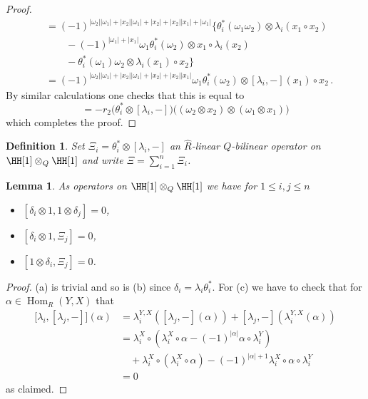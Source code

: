 \documentclass[english,letter paper,12pt,leqno]{article}
\newtheorem{lemma}[theorem]{Lemma}
\theoremstyle{example}
\newtheorem{definition}[theorem]{Definition}
\numberwithin{equation}{section}
\def\Hom{\operatorname{Hom}}
\begin{document}
\begin{proof}
\begin{align*}
&= (-1)^{|\omega_2||\omega_1| + |x_2||\omega_1| + |x_2| + |x_2||x_1| + |\omega_1|} \Big\{ \theta_i^*(\omega_1\omega_2) \otimes \lambda_i(x_1 \circ x_2)\\
&\qquad -(-1)^{|\omega_1| + |x_1|} \omega_1 \theta_i^*(\omega_2) \otimes x_1 \circ \lambda_i(x_2)\\
&\qquad - \theta_i^*(\omega_1)\omega_2 \otimes \lambda_i(x_1) \circ x_2 \Big\}\\
&= (-1)^{|\omega_2||\omega_1| + |x_2||\omega_1| + |x_2| + |x_2||x_1|} \omega_1 \theta_i^*(\omega_2) \otimes [\lambda_i,-](x_1) \circ x_2\,.
\end{align*}
By similar calculations one checks that this is equal to
\[
= -r_2\big( \theta_i^* \otimes [\lambda_i,-] \big)\big( (\omega_2 \otimes x_2) \otimes (\omega_1 \otimes x_1) \big)
\]
which completes the proof.
\end{proof}

\begin{definition} Set $\Xi_i = \theta_i^* \otimes [\lambda_i, -]$ an $\widehat{R}$-linear $Q$-bilinear operator on $\HH[1] \otimes_Q \HH[1]$ and write $\Xi = \sum_{i=1}^n \Xi_i$.
\end{definition}

\begin{lemma}\label{lemma_12_1} As operators on $\HH[1] \otimes_Q \HH[1]$ we have for $1 \le i,j \le n$
\begin{itemize}
\item[(a)] $[\delta_i \otimes 1, 1 \otimes \delta_j] = 0$,
\item[(b)] $[\delta_i \otimes 1, \Xi_j] = 0$, 
\item[(c)] $[1 \otimes \delta_i, \Xi_j] = 0$.
\end{itemize}
\end{lemma}
\begin{proof}
(a) is trivial and so is (b) since $\delta_i = \lambda_i \theta_i^*$. For (c) we have to check that for $\alpha \in \Hom_R(Y,X)$ that
\begin{align*}
\big[ \lambda_i, [\lambda_j,-] \big](\alpha) &= \lambda_i^{Y,X}( [\lambda_j,-](\alpha) ) + [\lambda_j,-]( \lambda_i^{Y,X}(\alpha) )\\
&= \lambda_i^X \circ (\lambda_i^X \circ \alpha - (-1)^{|\alpha|} \alpha \circ \lambda_i^Y )\\
&\quad + \lambda_i^X \circ (\lambda_i^X \circ \alpha) - (-1)^{|\alpha| + 1} \lambda_i^X \circ \alpha \circ \lambda_i^Y\\
&= 0
\end{align*}
as claimed. 
\end{proof}
\end{document}
